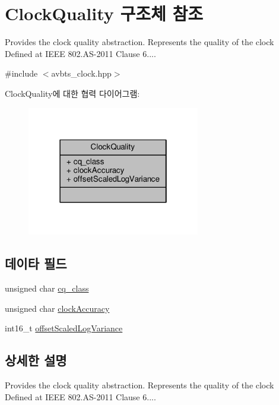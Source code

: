 \hypertarget{struct_clock_quality}{}\section{Clock\+Quality 구조체 참조}
\label{struct_clock_quality}


Provides the clock quality abstraction. Represents the quality of the clock Defined at I\+E\+EE 802.\+AS-\/2011 Clause 6....  




{\ttfamily \#include $<$avbts\+\_\+clock.\+hpp$>$}



Clock\+Quality에 대한 협력 다이어그램\+:
\nopagebreak
\begin{figure}[H]
\begin{center}
\leavevmode
\includegraphics[width=214pt]{struct_clock_quality__coll__graph}
\end{center}
\end{figure}
\subsection*{데이타 필드}
\begin{DoxyCompactItemize}
\item 
unsigned char \hyperlink{struct_clock_quality_a191db8e1a95facda21378069e8c6b504}{cq\+\_\+class}
\item 
unsigned char \hyperlink{struct_clock_quality_a8d8249dd6640438642472255c8e9aa5d}{clock\+Accuracy}
\item 
int16\+\_\+t \hyperlink{struct_clock_quality_a7106813bdd70baa204ed0c71038fe3a0}{offset\+Scaled\+Log\+Variance}
\end{DoxyCompactItemize}


\subsection{상세한 설명}
Provides the clock quality abstraction. Represents the quality of the clock Defined at I\+E\+EE 802.\+AS-\/2011 Clause 6.... 

